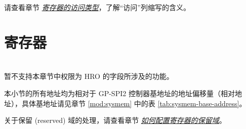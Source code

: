 \documentclass[main\_\_CN.tex]{subfiles}
\begin{document}
请查看章节 \hyperref[glossary-access-types]{\textit{寄存器的访问类型}}，了解“访问”列缩写的含义。




\section{寄存器}\label{Section:SPIREGList}
\begin{importantlisting}\\
\chipname{} 暂不支持本章节中权限为 HRO 的字段所涉及的功能。
\end{importantlisting}
本小节的所有地址均为相对于 GP-SPI2 控制器基地址的地址偏移量（相对地址），具体基地址请见章节 \ref{mod:sysmem} \textit{} 中的表 \ref{tab:sysmem-base-address}。

关于保留 (reserved) 域的处理，请查看章节 \hyperref[programming-reserved-field]{\textit{如何配置寄存器的保留域}}。




\end{document}
